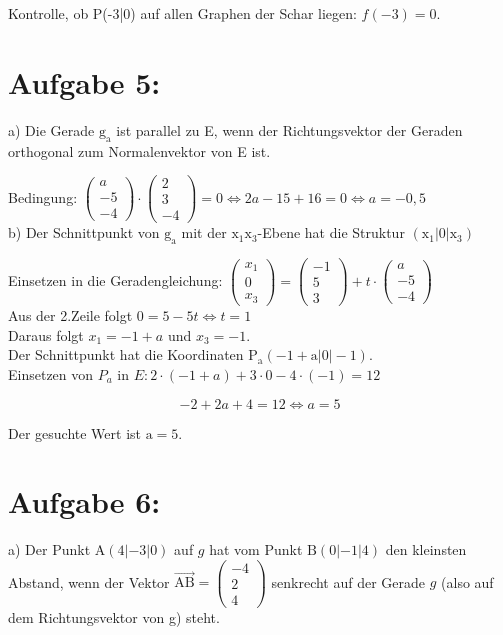 \documentclass[10pt]{article}
\begin{document}
Kontrolle, ob P(-3|0) auf allen Graphen der Schar liegen: $f(-3)=0$.

\section*{Aufgabe 5:}
a) Die Gerade $\mathrm{g}_{\mathrm{a}}$ ist parallel zu E, wenn der Richtungsvektor der Geraden orthogonal zum Normalenvektor von E ist.

Bedingung: $\left(\begin{array}{c}a \\ -5 \\ -4\end{array}\right) \cdot\left(\begin{array}{c}2 \\ 3 \\ -4\end{array}\right)=0 \Leftrightarrow 2 a-15+16=0 \Leftrightarrow a=-0,5$\\
b) Der Schnittpunkt von $\mathrm{g}_{\mathrm{a}}$ mit der $\mathrm{x}_{1} \mathrm{x}_{3}$-Ebene hat die Struktur $\left(\mathrm{x}_{1}|0| \mathrm{x}_{3}\right)$

Einsetzen in die Geradengleichung: $\left(\begin{array}{c}x_{1} \\ 0 \\ x_{3}\end{array}\right)=\left(\begin{array}{c}-1 \\ 5 \\ 3\end{array}\right)+t \cdot\left(\begin{array}{c}a \\ -5 \\ -4\end{array}\right)$\\
Aus der 2.Zeile folgt $0=5-5 t \Leftrightarrow t=1$\\
Daraus folgt $x_{1}=-1+a$ und $x_{3}=-1$.\\
Der Schnittpunkt hat die Koordinaten $\mathrm{P}_{\mathrm{a}}(-1+\mathrm{a}|0|-1)$.\\
Einsetzen von $P_{a}$ in $E: 2 \cdot(-1+a)+3 \cdot 0-4 \cdot(-1)=12$

$$
-2+2 a+4=12 \Leftrightarrow a=5
$$

Der gesuchte Wert ist $\mathrm{a}=5$.

\section*{Aufgabe 6:}
a) Der Punkt $\mathrm{A}(4|-3| 0)$ auf $g$ hat vom Punkt $\mathrm{B}(0|-1| 4)$ den kleinsten Abstand, wenn der Vektor $\overrightarrow{\mathrm{AB}}=\left(\begin{array}{c}-4 \\ 2 \\ 4\end{array}\right)$ senkrecht auf der Gerade $g$ (also auf dem Richtungsvektor von g) steht.
\end{document}

